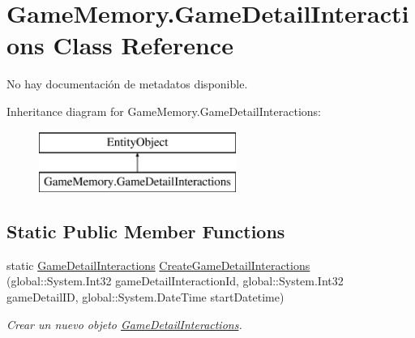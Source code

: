 \hypertarget{class_game_memory_1_1_game_detail_interactions}{\section{Game\-Memory.\-Game\-Detail\-Interactions Class Reference}
\label{class_game_memory_1_1_game_detail_interactions}
}


No hay documentación de metadatos disponible.  


Inheritance diagram for Game\-Memory.\-Game\-Detail\-Interactions\-:\begin{figure}[H]
\begin{center}
\leavevmode
\includegraphics[height=2.000000cm]{class_game_memory_1_1_game_detail_interactions}
\end{center}
\end{figure}
\subsection*{Static Public Member Functions}
\begin{DoxyCompactItemize}
\item 
static \hyperlink{class_game_memory_1_1_game_detail_interactions}{Game\-Detail\-Interactions} \hyperlink{class_game_memory_1_1_game_detail_interactions_a3fb5af1cd91c79675ef646b8e0d6f66b}{Create\-Game\-Detail\-Interactions} (global\-::\-System.\-Int32 game\-Detail\-Interaction\-Id, global\-::\-System.\-Int32 game\-Detail\-I\-D, global\-::\-System.\-Date\-Time start\-Datetime)
\begin{DoxyCompactList}\small\item\em Crear un nuevo objeto \hyperlink{class_game_memory_1_1_game_detail_interactions}{Game\-Detail\-Interactions}. \end{DoxyCompactList}\end{DoxyCompactItemize}
